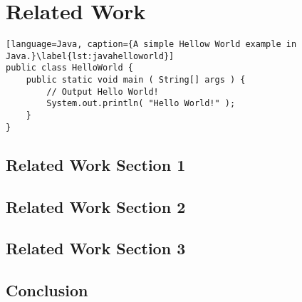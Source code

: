 %
\chapter{Related Work}
\label{sec:related}


\Blindtext[2][1]

\begin{lstlisting}[language=Java, caption={A simple Hellow World example in Java.}\label{lst:javahelloworld}]
public class HelloWorld {
	public static void main ( String[] args ) {
		// Output Hello World!
		System.out.println( "Hello World!" );
	}
}
\end{lstlisting}

\Blindtext[1][1]

\section{Related Work Section 1}
\label{sec:related:sec1}

\Blindtext[2][2]

\section{Related Work Section 2}
\label{sec:related:sec2}

\Blindtext[3][2]

\section{Related Work Section 3}
\label{sec:related:sec3}

\Blindtext[4][2]

\section{Conclusion}
\label{sec:related:conclusion}

\Blindtext[2][1]

